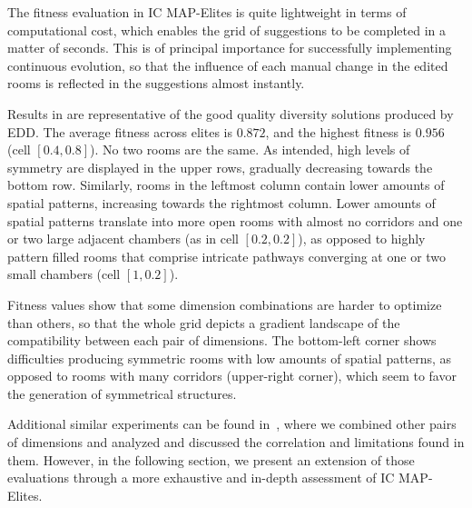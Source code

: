 The fitness evaluation in IC MAP-Elites is quite lightweight in terms of computational cost, which enables the grid of suggestions to be completed in a matter of seconds. This is of principal importance for successfully implementing continuous evolution, so that the influence of each manual change in the edited rooms is reflected in the suggestions almost instantly. %

Results in  are representative of the good quality diversity solutions produced by EDD. The average fitness across elites is $0.872$, and the highest fitness is $0.956$ (cell $[0.4,0.8]$). No two rooms are the same. As intended, high levels of symmetry are displayed in the upper rows, gradually decreasing towards the bottom row. Similarly, rooms in the leftmost column contain lower amounts of spatial patterns, increasing towards the rightmost column. Lower amounts of spatial patterns translate into more open rooms with almost no corridors and one or two large adjacent chambers (as in cell $[0.2, 0.2]$), as opposed to highly pattern filled rooms that comprise intricate pathways converging at one or two small chambers (cell $[1, 0.2]$). 

Fitness values show that some dimension combinations are harder to optimize than others, so that the whole grid depicts a gradient landscape of the compatibility between each pair of dimensions. The bottom-left corner shows difficulties producing symmetric rooms with low amounts of spatial patterns, as opposed to rooms with many corridors (upper-right corner), which seem to favor the generation of symmetrical structures.%

Additional similar experiments can be found in~, where we combined other pairs of dimensions and analyzed and discussed the correlation and limitations found in them. However, in the following section, we present an extension of those evaluations through a more exhaustive and in-depth assessment of IC MAP-Elites.


